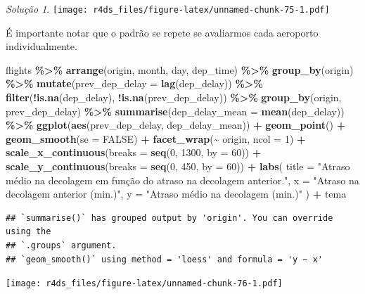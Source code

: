 \documentclass[
]{latex/krantz}
\newenvironment{Shaded}{\begin{snugshade}}{\end{snugshade}}
\newcommand{\AttributeTok}[1]{\textcolor[rgb]{0.13,0.29,0.53}{#1}}
\newcommand{\ConstantTok}[1]{\textcolor[rgb]{0.56,0.35,0.01}{#1}}
\newcommand{\DecValTok}[1]{\textcolor[rgb]{0.00,0.00,0.81}{#1}}
\newcommand{\FunctionTok}[1]{\textcolor[rgb]{0.13,0.29,0.53}{\textbf{#1}}}
\newcommand{\NormalTok}[1]{#1}
\newcommand{\SpecialCharTok}[1]{\textcolor[rgb]{0.81,0.36,0.00}{\textbf{#1}}}
\newcommand{\StringTok}[1]{\textcolor[rgb]{0.31,0.60,0.02}{#1}}
\theoremstyle{definition}
\theoremstyle{definition}
\theoremstyle{definition}
\theoremstyle{definition}
\theoremstyle{remark}
\newtheorem*{solution}{Solução}
\begin{document}
\begin{solution}
\texttt{[image: r4ds\_files/figure-latex/unnamed-chunk-75-1.pdf]}

É importante notar que o padrão se repete se avaliarmos cada aeroporto individualmente.

\begin{Shaded}
\begin{Highlighting}[]
\NormalTok{flights }\SpecialCharTok{\%\textgreater{}\%}
    \FunctionTok{arrange}\NormalTok{(origin, month, day, dep\_time) }\SpecialCharTok{\%\textgreater{}\%}
    \FunctionTok{group\_by}\NormalTok{(origin) }\SpecialCharTok{\%\textgreater{}\%}
    \FunctionTok{mutate}\NormalTok{(}\AttributeTok{prev\_dep\_delay =} \FunctionTok{lag}\NormalTok{(dep\_delay)) }\SpecialCharTok{\%\textgreater{}\%}
    \FunctionTok{filter}\NormalTok{(}\SpecialCharTok{!}\FunctionTok{is.na}\NormalTok{(dep\_delay), }\SpecialCharTok{!}\FunctionTok{is.na}\NormalTok{(prev\_dep\_delay)) }\SpecialCharTok{\%\textgreater{}\%}
    \FunctionTok{group\_by}\NormalTok{(origin, prev\_dep\_delay) }\SpecialCharTok{\%\textgreater{}\%}
    \FunctionTok{summarise}\NormalTok{(}\AttributeTok{dep\_delay\_mean =} \FunctionTok{mean}\NormalTok{(dep\_delay)) }\SpecialCharTok{\%\textgreater{}\%}
    \FunctionTok{ggplot}\NormalTok{(}\FunctionTok{aes}\NormalTok{(prev\_dep\_delay, dep\_delay\_mean)) }\SpecialCharTok{+}
        \FunctionTok{geom\_point}\NormalTok{() }\SpecialCharTok{+}
        \FunctionTok{geom\_smooth}\NormalTok{(}\AttributeTok{se =} \ConstantTok{FALSE}\NormalTok{) }\SpecialCharTok{+}
        \FunctionTok{facet\_wrap}\NormalTok{(}\SpecialCharTok{\textasciitilde{}}\NormalTok{ origin, }\AttributeTok{ncol =} \DecValTok{1}\NormalTok{) }\SpecialCharTok{+}
        \FunctionTok{scale\_x\_continuous}\NormalTok{(}\AttributeTok{breaks =} \FunctionTok{seq}\NormalTok{(}\DecValTok{0}\NormalTok{, }\DecValTok{1300}\NormalTok{, }\AttributeTok{by =} \DecValTok{60}\NormalTok{)) }\SpecialCharTok{+}
        \FunctionTok{scale\_y\_continuous}\NormalTok{(}\AttributeTok{breaks =} \FunctionTok{seq}\NormalTok{(}\DecValTok{0}\NormalTok{, }\DecValTok{450}\NormalTok{, }\AttributeTok{by =} \DecValTok{60}\NormalTok{)) }\SpecialCharTok{+}
        \FunctionTok{labs}\NormalTok{(}
            \AttributeTok{title =} \StringTok{"Atraso médio na decolagem em função do atraso na decolagem anterior."}\NormalTok{,}
            \AttributeTok{x =} \StringTok{"Atraso na decolagem anterior (min.)"}\NormalTok{,}
            \AttributeTok{y =} \StringTok{"Atraso médio na decolagem (min.)"}
\NormalTok{        ) }\SpecialCharTok{+}
\NormalTok{        tema}
\end{Highlighting}
\end{Shaded}

\begin{verbatim}
## `summarise()` has grouped output by 'origin'. You can override using the
## `.groups` argument.
## `geom_smooth()` using method = 'loess' and formula = 'y ~ x'
\end{verbatim}

\texttt{[image: r4ds\_files/figure-latex/unnamed-chunk-76-1.pdf]}
\end{solution}
\end{document}
